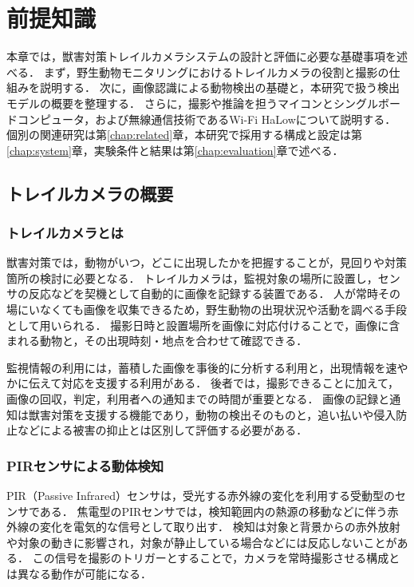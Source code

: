 \chapter{前提知識}
\label{chap:background}

本章では，獣害対策トレイルカメラシステムの設計と評価に必要な基礎事項を述べる．
まず，野生動物モニタリングにおけるトレイルカメラの役割と撮影の仕組みを説明する．
次に，画像認識による動物検出の基礎と，本研究で扱う検出モデルの概要を整理する．
さらに，撮影や推論を担うマイコンとシングルボードコンピュータ，および無線通信技術であるWi-Fi HaLowについて説明する．
個別の関連研究は第\ref{chap:related}章，本研究で採用する構成と設定は第\ref{chap:system}章，実験条件と結果は第\ref{chap:evaluation}章で述べる．

\section{トレイルカメラの概要}
\label{sec:background-trail-camera}
\subsection{トレイルカメラとは}
獣害対策では，動物がいつ，どこに出現したかを把握することが，見回りや対策箇所の検討に必要となる．
トレイルカメラは，監視対象の場所に設置し，センサの反応などを契機として自動的に画像を記録する装置である．
人が常時その場にいなくても画像を収集できるため，野生動物の出現状況や活動を調べる手段として用いられる\cite{Beery2019,IEICE2020}．
撮影日時と設置場所を画像に対応付けることで，画像に含まれる動物と，その出現時刻・地点を合わせて確認できる．

監視情報の利用には，蓄積した画像を事後的に分析する利用と，出現情報を速やかに伝えて対応を支援する利用がある．
後者では，撮影できることに加えて，画像の回収，判定，利用者への通知までの時間が重要となる．
画像の記録と通知は獣害対策を支援する機能であり，動物の検出そのものと，追い払いや侵入防止などによる被害の抑止とは区別して評価する必要がある．

\subsection{PIRセンサによる動体検知}
\label{sec:background-capture}
PIR（Passive Infrared）センサは，受光する赤外線の変化を利用する受動型のセンサである．
焦電型のPIRセンサでは，検知範囲内の熱源の移動などに伴う赤外線の変化を電気的な信号として取り出す．
検知は対象と背景からの赤外放射や対象の動きに影響され，対象が静止している場合などには反応しないことがある\cite{Welbourne2016,PanasonicPIR}．
この信号を撮影のトリガーとすることで，カメラを常時撮影させる構成とは異なる動作が可能になる．

